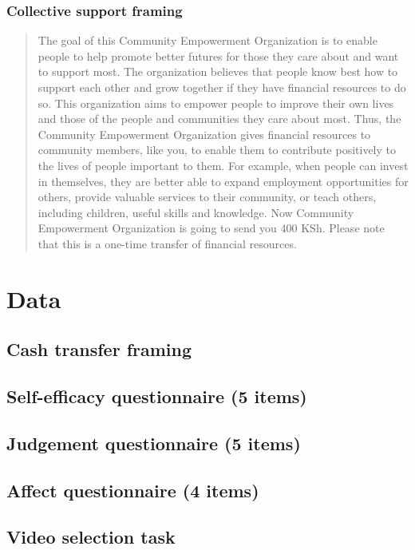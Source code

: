 \documentclass[11pt, a4paper]{article}\usepackage[]{graphicx}\usepackage[]{color}
\begin{document}
        \subsubsection{Collective support framing}

            \begin{quote}

                The goal of this Community Empowerment Organization is to enable people to help promote better futures for those they care about and want to support most. The organization believes that people know best how to support each other and grow together if they have financial resources to do so. This organization aims to empower people to improve their own lives and those of the people and communities they care about most. Thus, the Community Empowerment Organization gives financial resources to community members, like you, to enable them to contribute positively to the lives of people important to them. For example, when people can invest in themselves, they are better able to expand employment opportunities for others, provide valuable services to their community, or teach others, including children, useful skills and knowledge. Now Community Empowerment Organization is going to send you 400 KSh. Please note that this is a one-time transfer of financial resources.

            \end{quote}

\section{Data}

    \subsection{Cash transfer framing}
    \subsection{Self-efficacy questionnaire (5 items)}
    \subsection{Judgement questionnaire (5 items)}
    \subsection{Affect questionnaire (4 items)}
    \subsection{Video selection task}
\end{document}
